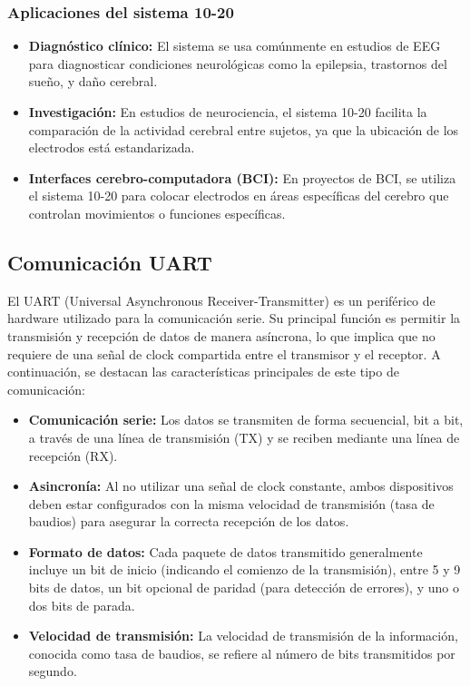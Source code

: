 \documentclass{article}
\begin{document}
\subsubsection{Aplicaciones del sistema 10-20}
\begin{itemize}
    \item \textbf{Diagnóstico clínico:} El sistema se usa comúnmente en estudios de EEG para diagnosticar condiciones neurológicas como la epilepsia, trastornos del sueño, y daño cerebral.
    \item \textbf{Investigación:} En estudios de neurociencia, el sistema 10-20 facilita la comparación de la actividad cerebral entre sujetos, ya que la ubicación de los electrodos está estandarizada.
    \item \textbf{Interfaces cerebro-computadora (BCI):} En proyectos de BCI, se utiliza el sistema 10-20 para colocar electrodos en áreas específicas del cerebro que controlan movimientos o funciones específicas.
\end{itemize}


\subsection{Comunicación UART}

El UART (Universal Asynchronous Receiver-Transmitter) es un periférico de hardware utilizado para la comunicación serie. Su principal función es permitir la transmisión y recepción de datos de manera asíncrona, lo que implica que no requiere de una señal de clock compartida entre el transmisor y el receptor. A continuación, se destacan las características principales de este tipo de comunicación:

\begin{itemize}
    \item \textbf{Comunicación serie:} Los datos se transmiten de forma secuencial, bit a bit, a través de una línea de transmisión (TX) y se reciben mediante una línea de recepción (RX).
    \item \textbf{Asincronía:} Al no utilizar una señal de clock constante, ambos dispositivos deben estar configurados con la misma velocidad de transmisión (tasa de baudios) para asegurar la correcta recepción de los datos.
    \item \textbf{Formato de datos:} Cada paquete de datos transmitido generalmente incluye un bit de inicio (indicando el comienzo de la transmisión), entre 5 y 9 bits de datos, un bit opcional de paridad (para detección de errores), y uno o dos bits de parada.
    \item \textbf{Velocidad de transmisión:} La velocidad de transmisión de la información, conocida como tasa de baudios, se refiere al número de bits transmitidos por segundo.
\end{itemize}
\end{document}
